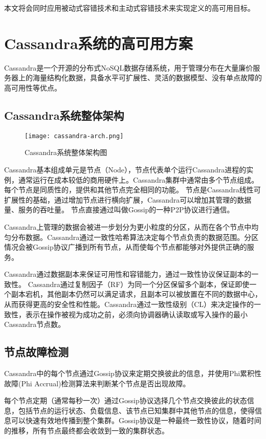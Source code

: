 本文将会同时应用被动式容错技术和主动式容错技术来实现定义的高可用目标。


\section{Cassandra系统的高可用方案}
Cassandra\cite{lakshman2010cassandra}是一个开源的分布式NoSQL数据存储系统，用于管理分布在大量廉价服务器上的海量结构化数据，具备水平可扩展性、灵活的数据模型、没有单点故障的高可用性等优点。

\subsection{Cassandra系统整体架构}

\begin{figure}
  \centering
  \texttt{[image: cassandra-arch.png]}
  \caption{Cassandra系统整体架构图}
  \label{fig:cassandra-arch}
\end{figure}

Cassandra基本组成单元是节点（Node），节点代表单个运行Cassandra进程的实例，通常运行在成本较低的商用硬件上。Cassandra集群中通常由多个节点组成。每个节点是同质性的，提供和其他节点完全相同的功能。
节点是Cassandra线性可扩展性的基础，通过增加节点进行横向扩展，Cassandra可以增加其管理的数据量、服务的吞吐量。
节点直接通过叫做Gossip的一种P2P协议进行通信。

Cassandra上管理的数据会被进一步划分为更小粒度的分区，从而在各个节点中均匀分布数据。Cassandra通过一致性哈希算法\cite{karger1997consistent}决定每个节点负责的数据范围。分区情况会被Gossip协议广播到所有节点，从而使每个节点都能够对外提供正确的服务。

Cassandra通过数据副本来保证可用性和容错能力，通过一致性协议保证副本的一致性。
Cassandra通过复制因子（RF）为同一个分区保留多个副本，保证即使一个副本宕机，其他副本仍然可以满足请求，且副本可以被放置在不同的数据中心，从而获得更高的安全性和性能。Cassandra通过一致性级别（CL）来决定操作的一致性，表示在操作被视为成功之前，必须向协调器确认读取或写入操作的最小Cassandra节点数。


\subsection{节点故障检测}

Cassandra中的每个节点通过Gossip协议来定期交换彼此的信息，并使用Phi累积性故障(Phi Accrual)检测算法\cite{hayashibara2004spl}来判断某个节点是否出现故障。

每个节点定期（通常每秒一次）通过Gossip协议选择几个节点交换彼此的状态信息，包括节点的运行状态、负载信息、该节点已知集群中其他节点的信息，使得信息可以快速有效地传播到整个集群。Gossip协议是一种最终一致性协议，随着时间的推移，所有节点最终都会收敛到一致的集群状态。


